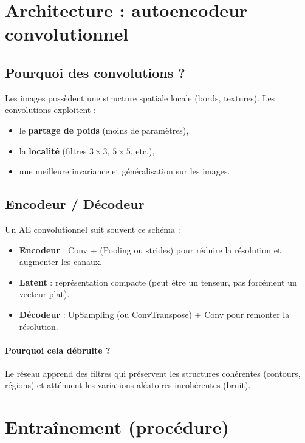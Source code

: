 \documentclass[11pt,a4paper]{article}
\begin{document}
\section{Architecture : autoencodeur convolutionnel}

\subsection{Pourquoi des convolutions ?}

Les images possèdent une structure spatiale locale (bords, textures). Les convolutions exploitent :
\begin{itemize}
  \item le \textbf{partage de poids} (moins de paramètres),
  \item la \textbf{localité} (filtres $3\times 3$, $5\times 5$, etc.),
  \item une meilleure invariance et généralisation sur les images.
\end{itemize}

\subsection{Encodeur / Décodeur}

Un AE convolutionnel suit souvent ce schéma :
\begin{itemize}
  \item \textbf{Encodeur} : Conv + (Pooling ou strides) pour réduire la résolution et augmenter les canaux.
  \item \textbf{Latent} : représentation compacte (peut être un tenseur, pas forcément un vecteur plat).
  \item \textbf{Décodeur} : UpSampling (ou ConvTranspose) + Conv pour remonter la résolution.
\end{itemize}

\paragraph{Pourquoi cela débruite ?}
Le réseau apprend des filtres qui préservent les structures cohérentes (contours, régions) et atténuent les variations aléatoires incohérentes (bruit).

\section{Entraînement (procédure)}
\end{document}
